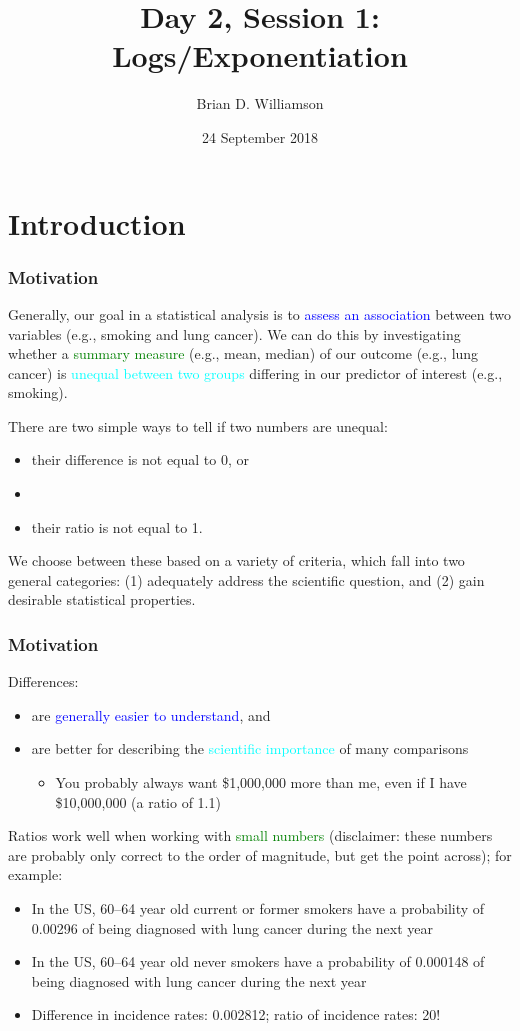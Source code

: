 \documentclass[11pt]{beamer}
\title{Day 2, Session 1: Logs/Exponentiation}
\author{Brian D. Williamson}
\institute{EPI/BIOST Bootcamp 2018}
\date{24 September 2018}
\newcommand{\myframe}[1]{\begin{frame} \frametitle{#1}}
\newenvironment{spaceitemize}
{ \begin{itemize}
    \setlength{\itemsep}{10pt}
    \setlength{\parskip}{0pt}
    \setlength{\parsep}{0pt}     }
{ \end{itemize}                  }
\begin{document}
\begin{frame}
\titlepage
\end{frame}

\section{Introduction}
\myframe{Motivation}
Generally, our goal in a statistical analysis is to \textcolor{blue}{assess an association} between two variables (e.g., smoking and lung cancer). We can do this by investigating whether a \textcolor{green}{summary measure} (e.g., mean, median) of our outcome (e.g., lung cancer) is \textcolor{cyan}{unequal between two groups} differing in our predictor of interest (e.g., smoking).

There are two simple ways to tell if two numbers are unequal: 
\begin{itemize}
\item their difference is not equal to 0, or
\item[]
\item their ratio is not equal to 1.
\end{itemize}

We choose between these based on a variety of criteria, which fall into two general categories: (1) adequately address the scientific question, and (2) gain desirable statistical properties.
\end{frame}

\myframe{Motivation}
Differences:
\vspace{-0.5cm}
\begin{spaceitemize}
\item are \textcolor{blue}{generally easier to understand}, and 
\item are better for describing the \textcolor{cyan}{scientific importance} of many comparisons
\begin{itemize}
\item You probably always want \$1,000,000 more than me, even if I have \$10,000,000 (a ratio of 1.1)
\end{itemize}
\end{spaceitemize}
Ratios work well when working with \textcolor{green}{small numbers} (disclaimer: these numbers are probably only correct to the order of magnitude, but get the point across); for example:
{\fontsize{10pt}{7.2}\selectfont
\begin{itemize}
\item In the US, 60--64 year old current or former smokers have a probability of 0.00296 of being diagnosed with lung cancer during the next year
\item In the US, 60--64 year old never smokers have a probability of 0.000148 of being diagnosed with lung cancer during the next year
\item Difference in incidence rates: 0.002812; ratio of incidence rates: 20!
\end{itemize}
}
\end{frame}
\end{document}
